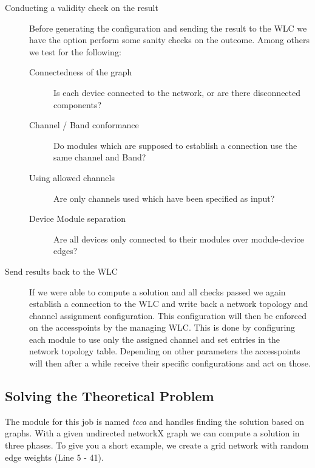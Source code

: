 \begin{description}
	  \item[Conducting a validity check on the result]
	    Before generating the configuration and sending the result to the WLC we have the option perform some sanity checks on the outcome.
	    Among others we test for the following:
	    
	    \begin{description}
	      \item [Connectedness of the graph]
		Is each device connected to the network, or are there disconnected components?
	      \item [Channel / Band conformance]
		Do modules which are supposed to establish a connection use the same channel and Band?
	      \item [Using allowed channels]
		Are only channels used which have been specified as input?
	      \item [Device Module separation]
		Are all devices only connected to their modules over module-device edges?
	    \end{description}
	    
	\item [Send results back to the WLC]
	  If we were able to compute a solution and all checks passed we again establish a connection to the WLC and write back a network topology and channel assignment
	  configuration. This configuration will then be enforced on the accesspoints by the managing WLC.
	  This is done by configuring each module to use only the assigned channel and set entries in the network topology table. Depending on other parameters the
	  accesspoints will then after a while receive their specific configurations and act on those.
      \end{description}
      
    \subsection{Solving the Theoretical Problem}
      The module for this job is named \textit{tcca} and handles finding the solution based on graphs.
      With a given undirected networkX graph we can compute a solution in three phases.
      To give you a short example, we create a grid network with random edge weights (Line 5 - 41).
      
